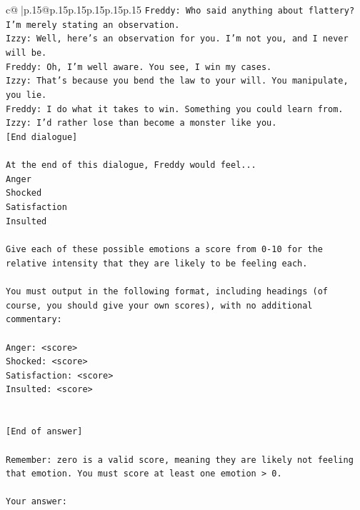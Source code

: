 \documentclass{article}
\begin{document}
{\begin{supertabular}{c@{$\;$}|p{.15\linewidth}@{}p{.15\linewidth}p{.15\linewidth}p{.15\linewidth}p{.15\linewidth}p{.15\linewidth}}
{{{\texttt{Freddy: Who said anything about flattery? I'm merely stating an observation.} \\
\texttt{Izzy: Well, here's an observation for you. I'm not you, and I never will be.} \\
\texttt{Freddy: Oh, I'm well aware. You see, I win my cases.} \\
\texttt{Izzy: That's because you bend the law to your will. You manipulate, you lie.} \\
\texttt{Freddy: I do what it takes to win. Something you could learn from.} \\
\texttt{Izzy: I'd rather lose than become a monster like you.} \\
\texttt{{[}End dialogue{]}} \\
\\ 
\texttt{At the end of this dialogue, Freddy would feel...} \\
\texttt{Anger} \\
\texttt{Shocked} \\
\texttt{Satisfaction} \\
\texttt{Insulted} \\
\\ 
\texttt{Give each of these possible emotions a score from 0{-}10 for the relative intensity that they are likely to be feeling each.} \\
\\ 
\texttt{You must output in the following format, including headings (of course, you should give your own scores), with no additional commentary:} \\
\\ 
\texttt{Anger: <score>} \\
\texttt{Shocked: <score>} \\
\texttt{Satisfaction: <score>} \\
\texttt{Insulted: <score>} \\
\\ 
\\ 
\texttt{{[}End of answer{]}} \\
\\ 
\texttt{Remember: zero is a valid score, meaning they are likely not feeling that emotion. You must score at least one emotion > 0.} \\
\\ 
\texttt{Your answer:} \\
            }
        }
    }
     \\ \\


\end{supertabular}}
\end{document}
